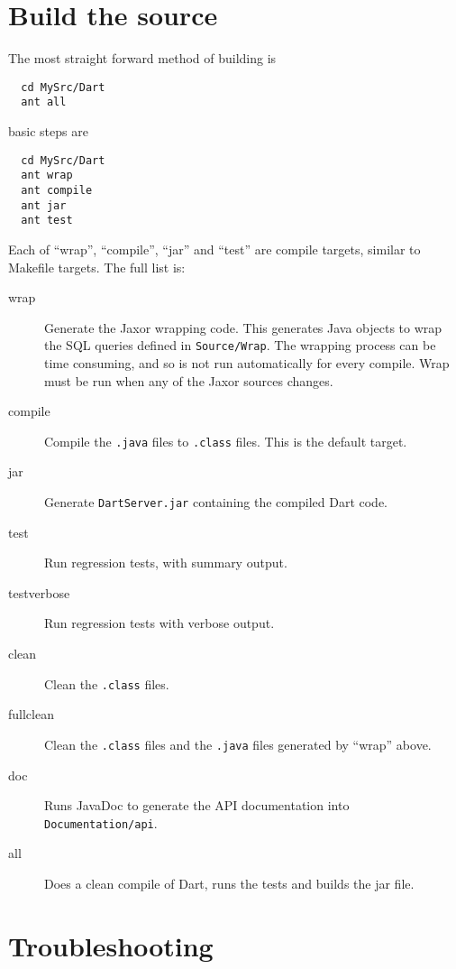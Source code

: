 \documentclass{InsightBook}
\newcommand{\filename}[1]{\texttt{#1}}
\begin{document}
\section{Build the source}

The most straight forward method of building is
\begin{verbatim}
  cd MySrc/Dart
  ant all
\end{verbatim}
 basic steps are
\begin{verbatim}
  cd MySrc/Dart
  ant wrap
  ant compile
  ant jar
  ant test
\end{verbatim}

Each of ``wrap'', ``compile'', ``jar'' and ``test'' are compile
targets, similar to Makefile targets. The full list is:
\begin{description}
\item[wrap] Generate the Jaxor wrapping code. This generates Java
  objects to wrap the SQL queries defined in \texttt{Source/Wrap}. The
  wrapping process can be time consuming, and so is not run
  automatically for every compile.  Wrap must be run when any of the
  Jaxor sources changes.
\item[compile] Compile the \filename{.java} files to \filename{.class}
  files. This is the default target.
\item[jar] Generate \filename{DartServer.jar} containing the compiled
  Dart code.
\item[test] Run regression tests, with summary output.
\item[testverbose] Run regression tests with verbose output.
\item[clean] Clean the \filename{.class} files.
\item[fullclean] Clean the \filename{.class} files and the
  \filename{.java} files generated by ``wrap'' above.
\item[doc] Runs JavaDoc to generate the API documentation into
  \filename{Documentation/api}.
\item[all] Does a clean compile of Dart, runs the tests and builds the
jar file.
\end{description}

\section{Troubleshooting}
\end{document}
